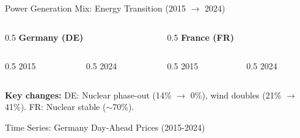 \documentclass[aspectratio=169]{beamer}
\begin{document}
\begin{frame}{Power Generation Mix: Energy Transition (2015 $\rightarrow$ 2024)}
\begin{columns}
\begin{column}{0.5\textwidth}
\centering
\textbf{Germany (DE)}
\vspace{0.2cm}

\begin{columns}
\begin{column}{0.5\textwidth}
\centering
\small 2015

\end{column}
\begin{column}{0.5\textwidth}
\centering
\small 2024

\end{column}
\end{columns}
\end{column}

\begin{column}{0.5\textwidth}
\centering
\textbf{France (FR)}
\vspace{0.2cm}

\begin{columns}
\begin{column}{0.5\textwidth}
\centering
\small 2015

\end{column}
\begin{column}{0.5\textwidth}
\centering
\small 2024

\end{column}
\end{columns}
\end{column}
\end{columns}

\vspace{0.3cm}
\small
\textbf{Key changes:} DE: Nuclear phase-out (14\% $\rightarrow$ 0\%), wind doubles (21\% $\rightarrow$ 41\%). FR: Nuclear stable ($\sim$70\%).
\end{frame}

\begin{frame}{Time Series: Germany Day-Ahead Prices (2015-2024)}
\begin{center}

\end{center}
\end{frame}
\end{document}
